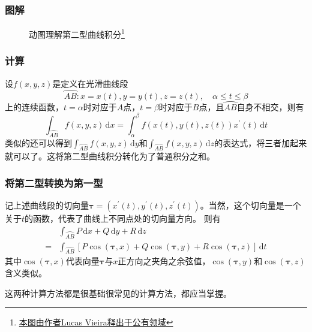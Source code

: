 \documentclass[xetex]{beamer}
\begin{document}
    \begin{frame}
        \frametitle{图解}
        \begin{figure}[ht]
            \centering
            \caption{动图理解第二型曲线积分\footnote[1]{\href{https://commons.wikimedia.org/wiki/File:Line_integral_of_vector_field.gif}{本图由作者Lucas Vieira释出于公有领域}}}
        \end{figure}
    
    \end{frame}

    \begin{frame}
        \frametitle{计算}
    
        设$f(x,y,z)$是定义在光滑曲线段
        $$\wideparen{AB}:x=x(t),y=y(t),z=z(t),\quad \alpha\leq t\leq\beta$$
        上的连续函数，$t=\alpha$时对应于$A$点，$t=\beta$时对应于$B$点，且$\wideparen{AB}$自身不相交，则有
        $$\int_{\wideparen{AB}}f(x,y,z)\,\mathrm{d}x=\int_\alpha^\beta f\left(x(t),y(t),z(t)\right)x^\prime(t)\,\mathrm{d}t$$
        类似的还可以得到$\displaystyle\int_{\wideparen{AB}}f(x,y,z)\,\mathrm{d}y$和$\displaystyle\int_{\wideparen{AB}}f(x,y,z)\,\mathrm{d}z$的表达式，将三者加起来就可以了。\pause 这将第二型曲线积分转化为了\alert{普通积分}之和。
    
    \end{frame}

    \begin{frame}
        \frametitle{将第二型转换为第一型}
    
        记上述曲线段的切向量$\boldsymbol{\tau}=\left(x^\prime(t),y^\prime(t),z^\prime(t)\right)$。当然，这个切向量是一个关于$t$的函数，代表了曲线上不同点处的切向量方向。
        则有
        $$\begin{aligned}
            & \int_{\wideparen{AB}}P\,\mathrm{d}x+Q\,\mathrm{d}y+R\,\mathrm{d}z \\
            = & \int_{\wideparen{AB}}\left[P\cos(\boldsymbol{\tau},x)+Q\cos(\boldsymbol{\tau},y)+R\cos(\boldsymbol{\tau},z)\right]\,\mathrm{d}t
        \end{aligned}$$
        其中$\cos(\boldsymbol{\tau},x)$代表向量$\boldsymbol{\tau}$与$x$正方向之夹角之余弦值，$\cos(\boldsymbol{\tau},y)$和$\cos(\boldsymbol{\tau},z)$含义类似。\pause

        这两种计算方法都是很基础很常见的计算方法，都应当掌握。
    
    \end{frame}
\end{document}
